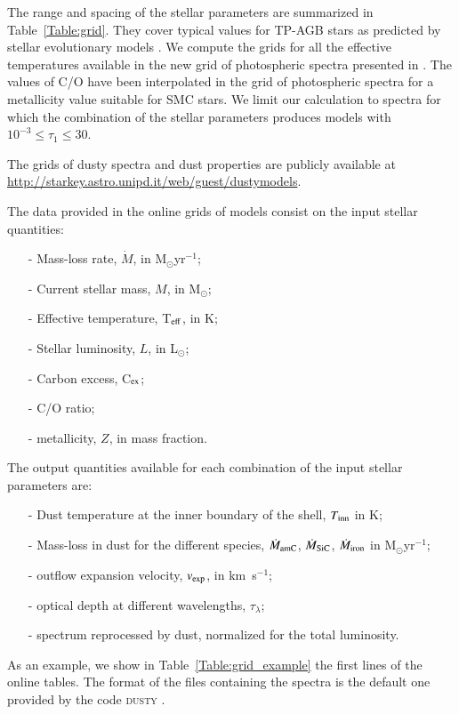 \documentclass[useAMS,usenatbib]{mn2e/mn2e}
\begin{document}
The range and spacing of the stellar parameters are summarized in Table~\ref{Table:grid}. They cover typical values for TP-AGB stars as predicted by stellar evolutionary models \citep{Marigo_etal17, marigoetal13}.
We compute the grids for all the effective temperatures available in the new grid of photospheric spectra presented in \citet{Aringer16}. The values of C/O have been interpolated in the grid of photospheric spectra for a metallicity value suitable for SMC stars.
We limit our calculation to spectra for which the combination of the stellar parameters produces models with $10^{-3}\le\tau_1\le 30 $.

The grids of dusty spectra and dust properties are publicly available at \url{http://starkey.astro.unipd.it/web/guest/dustymodels}. 

The data provided in the online grids of models consist on the input stellar quantities: 
\begin{itemize}
\item[-] Mass-loss rate, $\dot{M}$, in M$_\odot$yr$^{-1}$;
\item[-] Current stellar mass, $M$, in M$_\odot$;
\item[-] Effective temperature, T$_{\rm eff}$, in K;
\item[-] Stellar luminosity, $L$, in L$_\odot$;
\item[-] Carbon excess, C$_{\rm ex}$;
\item[-] C/O ratio;
\item[-] metallicity, $Z$, in mass fraction. 
\end{itemize}

The output quantities available for each combination of the input stellar parameters are:
\begin{itemize}
\item[-] Dust temperature at the inner boundary of the shell, $T_{\rm inn}$ in K;
\item[-] Mass-loss in dust for the different species, $\dot{M}_{\rm amC}$, $\dot{M}_{\rm SiC}$, $\dot{M}_{\rm iron}$ in  M$_\odot$yr$^{-1}$;
\item[-] outflow expansion velocity, $v_{\rm exp}$, in km~s$^{-1}$;
\item[-] optical depth at different wavelengths, $\tau_\lambda$;
\item[-] spectrum reprocessed by dust, normalized for the total luminosity.
\end{itemize}
As an example, we show in Table~\ref{Table:grid_example} the first lines of the online tables. The format of the files containing the spectra is the default one provided by the code \textsc{dusty} \citep{Ivezic97}.
\end{document}
